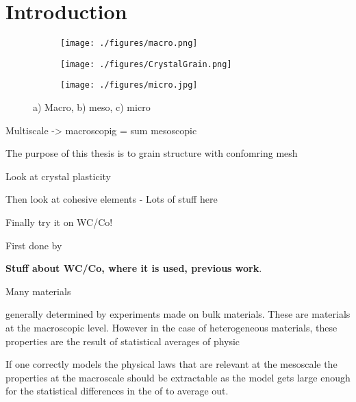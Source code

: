 \documentclass[introduction.tex]{subfiles}
\begin{document}
\chapter{Introduction}



 \begin{figure}
\centering

\begin{subfigure}{.1\textwidth}
  \centering
  \texttt{[image: ./figures/macro.png]}
  \caption{}
  \label{fig:macro}
\end{subfigure}
\label{fig:macro}
\scalebox{1.5}{$\boldsymbol{\longrightarrow}$}
\begin{subfigure}{.33\textwidth}
  \centering
  \texttt{[image: ./figures/CrystalGrain.png]}
  \caption{}
  \label{fig:meso}
\end{subfigure}%
\scalebox{1.5}{$\boldsymbol{\longrightarrow}$}
\begin{subfigure}{.33\textwidth}
  \centering
  \texttt{[image: ./figures/micro.jpg]}
  \caption{}
  \label{fig:micro}
\end{subfigure}%
\caption{a) Macro, b) meso, c) micro\cite{Ozawa:ko5009}}

\end{figure}

Multiscale -> macroscopig = sum mesoscopic


The purpose of this thesis is to grain structure with confomring mesh

Look at crystal plasticity

Then look at cohesive elements
- Lots of stuff here


Finally try it on WC/Co!

First done by 

\textbf{Stuff about WC/Co, where it is used, previous work}.

Many materials




generally determined by experiments made on bulk materials. These are materials at the macroscopic level. However in the case of heterogeneous materials, these properties are the result of statistical averages of physic 



If one correctly models the physical laws that are relevant at the mesoscale the properties at the macroscale should be extractable as the model gets large enough for the statistical differences in the   of  to average out.
\end{document}
